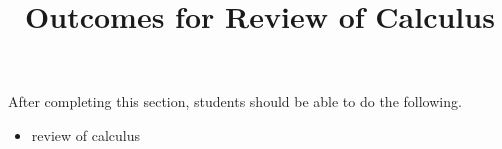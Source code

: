 \documentclass{ximera}
\title{Outcomes for Review of Calculus}
\begin{document}
\begin{abstract}
\end{abstract}

\maketitle

\begin{sectionOutcomes}

After completing this section, students should be able to do the following.

\begin{itemize}
\item review of calculus
\end{itemize}

\end{sectionOutcomes}
\end{document}

